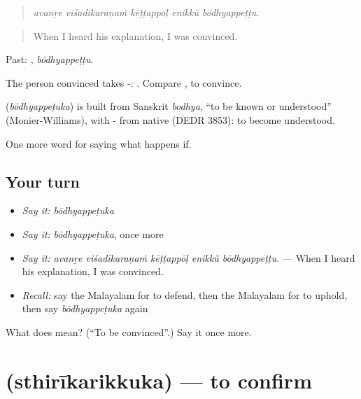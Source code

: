 \begin{quote}
\emph{avanṟe viśadīkaraṇaṁ kēṭṭappōḷ enikkŭ bōdhyappeṭṭu.}
\end{quote}

\begin{quote}
When I heard his explanation, I was convinced.
\end{quote}

Past: , \emph{bōdhyappeṭṭu}.

The person convinced takes -:  . Compare , to convince.

\begin{cousinweb}
\textbf{} (\emph{bōdhyappeṭuka}) is built from Sanskrit \emph{bodhya}, \textquotedblleft{}to be known or understood\textquotedblright{} (Monier-Williams), with - from native  (DEDR 3853): to become understood.
\end{cousinweb}

\begin{grammarlens}[title={What you've built}]
One more word for saying what happens if.
\end{grammarlens}

\subsection*{Your turn}
\begin{itemize}
\raggedright
  \item \emph{Say it:} \emph{bōdhyappeṭuka}
  \item \emph{Say it:} \emph{bōdhyappeṭuka}, once more
  \item \emph{Say it:} \emph{avanṟe viśadīkaraṇaṁ kēṭṭappōḷ enikkŭ bōdhyappeṭṭu.} — When I heard his explanation, I was convinced.
  \item \emph{Recall:} say the Malayalam for to defend, then the Malayalam for to uphold, then say \emph{bōdhyappeṭuka} again
\end{itemize}

\begin{tcolorbox}[breakable,colback=teal!4,colframe=teal!35!black,title={Before you move on}]
What does  mean? (\textquotedblleft{}To be convinced\textquotedblright{}.) Say it once more.
\end{tcolorbox}
\section[\texorpdfstring{\ml{സ്ഥിരീകരിക്കുക} (sthirīkarikkuka)}{സ്ഥിരീകരിക്കുക (sthirīkarikkuka)}]{ (sthirīkarikkuka) — to confirm}

